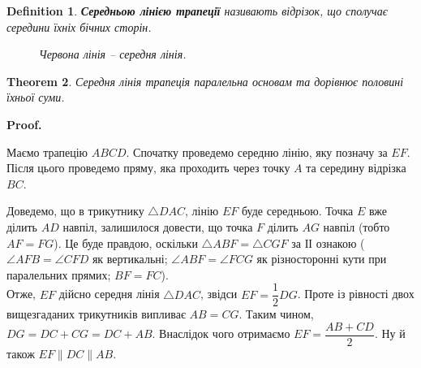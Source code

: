 \documentclass[a4paper, 10pt]{article}
\makeatletter
\theoremstyle{theoremdd}
\newtheorem{theorem}{Theorem}[subsection]
\theoremstyle{theoremdd}
\theoremstyle{theoremdd}
\newtheorem{definition}[theorem]{Definition}
\theoremstyle{theoremdd}
\theoremstyle{theoremdd}
\theoremstyle{theoremdd}
\theoremstyle{theoremdd}
\theoremstyle{theoremdd}
\theoremstyle{theoremdd}
\renewenvironment{proof}[1][Proof.\\]{\par
\pushQED{\hfill \qed}%
\normalfont \topsep6\p@\@plus6\p@\relax
\trivlist
\item\relax
{\bfseries
#1\@addpunct{.}}\hspace\labelsep\ignorespaces
}{%
\popQED\endtrivlist\@endpefalse
}
\makeatother
\begin{document}
\begin{definition}
\textbf{Середньою лінією трапеції} називають відрізок, що сполучає середини їхніх бічних сторін.
\begin{figure}[H]
\centering
{}
\caption*{Червона лінія -- середня лінія.}
\end{figure}
\end{definition}

\begin{theorem}
Середня лінія трапеція паралельна основам та дорівнює половині їхньої суми.
\end{theorem}

\begin{proof}
Маємо трапецію $ABCD$. Спочатку проведемо середню лінію, яку позначу за $EF$. Після цього проведемо пряму, яка проходить через точку $A$ та середину відрізка $BC$.
\begin{figure}[H]
\centering
{}
\end{figure}
Доведемо, що в трикутнику $\triangle DAC$, лінію $EF$ буде середньою. Точка $E$ вже ділить $AD$ навпіл, залишилося довести, що точка $F$ ділить $AG$ навпіл (тобто $AF = FG$). Це буде правдою, оскільки $\triangle ABF = \triangle CGF$ за ІІ ознакою ($\angle AFB = \angle CFD$ як вертикальні; $\angle ABF = \angle FCG$ як різносторонні кути при паралельних прямих; $BF = FC$).\\
Отже, $EF$ дійсно середня лінія $\triangle DAC$, звідси $EF = \dfrac{1}{2}DG$. Проте із рівності двох вищезгаданих трикутників випливає $AB = CG$. Таким чином, $DG = DC + CG = DC + AB$. Внаслідок чого отримаємо $EF = \dfrac{AB + CD}{2}$. Ну й також $EF \parallel DC \parallel AB$.
\end{proof}
\end{document}
